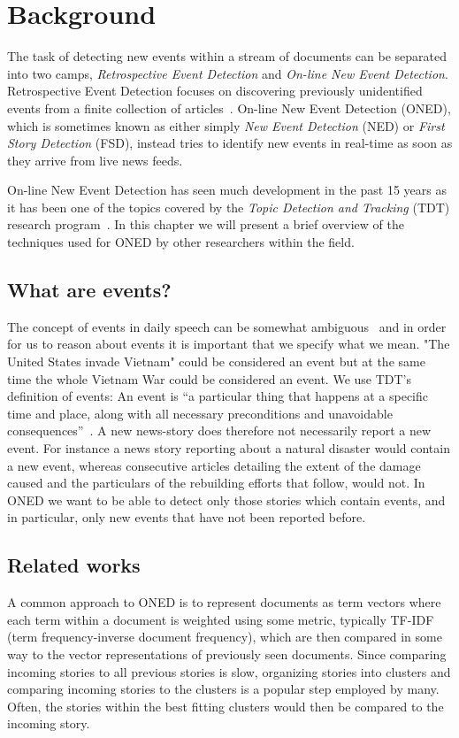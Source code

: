 \chapter{Background}
\label{chapter:background}

The task of detecting new events within a stream of documents can be separated into two camps, \emph{Retrospective Event Detection} and \emph{On-line New Event Detection}. Retrospective Event Detection focuses on discovering previously unidentified events from a finite collection of articles~\cite{yang1998study}. On-line New Event Detection (ONED), which is sometimes known as either simply \emph{New Event Detection} (NED) or \emph{First Story Detection} (FSD), instead tries to identify new events in real-time as soon as they arrive from live news feeds.

On-line New Event Detection has seen much development in the past 15 years as it has been one of the topics covered by the \emph{Topic Detection and Tracking} (TDT) research program~\cite{tdt2004annotation}. In this chapter we will present a brief overview of the techniques used for ONED by other researchers within the field.

\section{What are events?}
The concept of events in daily speech can be somewhat ambiguous~\cite{papka1999online} and in order for us to reason about events it is important that we specify what we mean. "The United States invade Vietnam" could be considered an event but at the same time the whole Vietnam War could be considered an event. We use TDT's definition of events: An event is ``a particular thing that happens at a specific time and place, along with all necessary preconditions and unavoidable consequences''~\cite{tdt2004annotation}. 
A new news-story does therefore not necessarily report a new event. For instance a news story reporting about a natural disaster would contain a new event, whereas consecutive articles detailing the extent of the damage caused and the particulars of the rebuilding efforts that follow, would not. In ONED we want to be able to detect only those stories which contain events, and in particular, only new events that have not been reported before.

\section{Related works}
A common approach to ONED is to represent documents as term vectors where each term within a document is weighted using some metric, typically TF-IDF (term frequency-inverse document frequency), which are then compared in some way to the vector representations of previously seen documents. Since comparing incoming stories to all previous stories is slow, organizing stories into clusters and comparing incoming stories to the clusters is a popular step employed by many. Often, the stories within the best fitting clusters would then be compared to the incoming story.


